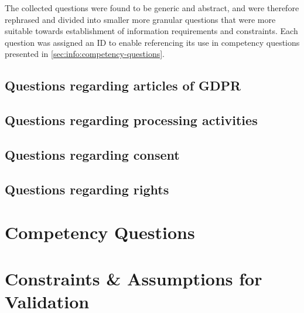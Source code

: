 The collected questions were found to be generic and abstract, and were therefore rephrased and divided into smaller more granular questions that were more suitable towards establishment of information requirements and constraints. 
Each question was assigned an ID to enable referencing its use in competency questions presented in \autoref{sec:info:competency-questions}.

\subsection{Questions regarding articles of GDPR}

\subsection{Questions regarding processing activities}

\subsection{Questions regarding consent}

\subsection{Questions regarding rights}

\section{Competency Questions}\label{sec:info:competency-questions}

\section{Constraints \& Assumptions for Validation}\label{sec:info:constraints}
